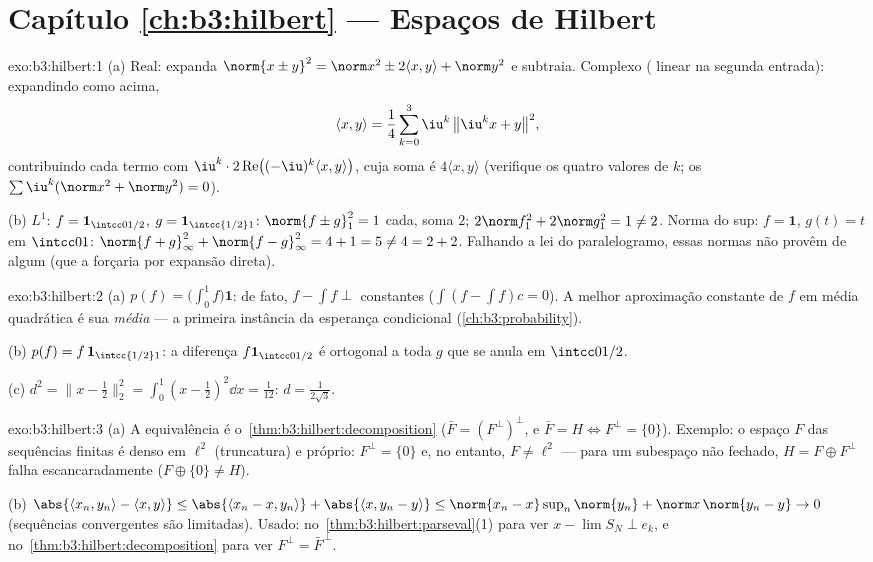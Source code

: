 \section*{Capítulo \ref{ch:b3:hilbert} --- Espaços de Hilbert}

\begin{solution}{exo:b3:hilbert:1}
(a) Real: expanda $\norm{x \pm y}^2 = \norm x^2 \pm 2\langle
x,y\rangle + \norm y^2$ e subtraia. Complexo (
linear na segunda entrada): expandindo como acima,
\[
\langle x, y\rangle = \frac14\sum_{k=0}^{3}
\iu^k\,\bigl\|\iu^kx + y\bigr\|^2,
\]
contribuindo cada termo com $\iu^k\cdot2\operatorname{Re}\bigl(
(-\iu)^k\langle x,y\rangle\bigr)$, cuja soma é $4\langle
x,y\rangle$ (verifique os quatro valores de $k$; os $\sum\iu^k
(\norm x^2 + \norm y^2) = 0$).

(b) $L^1$: $f = \mathbf 1_{\intcc0{1/2}}$, $g = \mathbf
1_{\intcc{1/2}1}$: $\norm{f\pm g}_1^2 = 1$ cada, soma $2$;
$2\norm f_1^2 + 2\norm g_1^2 = 1 \neq 2$. Norma do sup: $f =
\mathbf 1$, $g(t) = t$ em $\intcc01$: $\norm{f + g}_\infty^2 +
\norm{f-g}_\infty^2 = 4 + 1 = 5 \neq 4 = 2 + 2$. Falhando a
lei do paralelogramo, essas normas não provêm de  algum
(que a forçaria por expansão direta).
\end{solution}

\begin{solution}{exo:b3:hilbert:2}
(a) $p(f) = \bigl(\int_0^1f\bigr)\mathbf 1$: de fato, $f - \int f
\perp$ constantes ($\int(f - \int f)c = 0$). A melhor aproximação constante
de $f$ em média quadrática é sua \emph{média} ---
a primeira instância da esperança condicional
(\cref{ch:b3:probability}).

(b) $p(f) = f\,\mathbf 1_{\intcc{1/2}1}$: a diferença
$f\mathbf 1_{\intcc0{1/2}}$ é ortogonal a toda $g$
que se anula em $\intcc0{1/2}$.

(c) $d^2 = \bigl\|x - \tfrac12\bigr\|_2^2 = \int_0^1(x -
\tfrac12)^2\dd x = \tfrac1{12}$: $d = \frac1{2\sqrt3}$.
\end{solution}

\begin{solution}{exo:b3:hilbert:3}
(a) A equivalência é o~\cref{thm:b3:hilbert:decomposition}
($\bar F = (F^\perp)^\perp$, e $\bar F = H \iff F^\perp =
\{0\}$). Exemplo: o espaço $F$ das sequências finitas é denso
em $\ell^2$ (truncatura) e próprio: $F^\perp = \{0\}$ e, no entanto, $F
\neq \ell^2$ --- para um subespaço não fechado, $H = F \oplus
F^\perp$ falha escancaradamente ($F \oplus \{0\} \neq H$).

(b) $\abs{\langle x_n, y_n\rangle - \langle x, y\rangle} \leq
\abs{\langle x_n - x, y_n\rangle} + \abs{\langle x, y_n -
y\rangle} \leq \norm{x_n - x}\sup_n\norm{y_n} + \norm
x\,\norm{y_n - y} \to 0$ (sequências convergentes são limitadas).
Usado: no~\cref{thm:b3:hilbert:parseval}(1) para ver $x - \lim
S_N \perp e_k$, e no~\cref{thm:b3:hilbert:decomposition}
para ver $F^\perp = \bar F^{\,\perp}$.
\end{solution}

